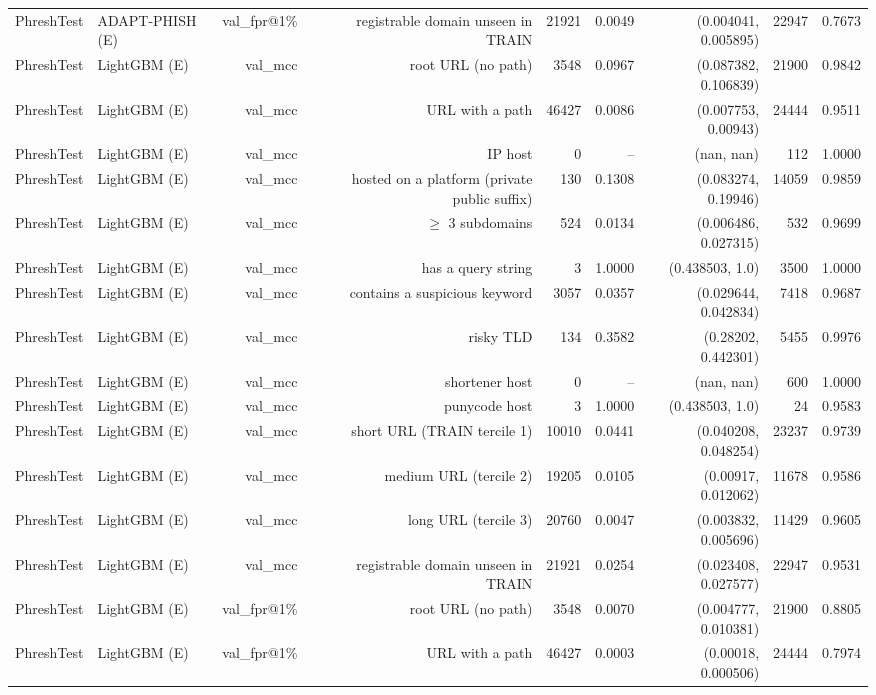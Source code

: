 \begin{table}[t]
\begin{tabular}{llrrrrrrr}
PhreshTest & ADAPT-PHISH (E) & val\_fpr@1\% & registrable domain unseen in TRAIN & 21921 & 0.0049 & (0.004041, 0.005895) & 22947 & 0.7673 \\
PhreshTest & LightGBM (E) & val\_mcc & root URL (no path) & 3548 & 0.0967 & (0.087382, 0.106839) & 21900 & 0.9842 \\
PhreshTest & LightGBM (E) & val\_mcc & URL with a path & 46427 & 0.0086 & (0.007753, 0.00943) & 24444 & 0.9511 \\
PhreshTest & LightGBM (E) & val\_mcc & IP host & 0 & -- & (nan, nan) & 112 & 1.0000 \\
PhreshTest & LightGBM (E) & val\_mcc & hosted on a platform (private public suffix) & 130 & 0.1308 & (0.083274, 0.19946) & 14059 & 0.9859 \\
PhreshTest & LightGBM (E) & val\_mcc & $\geq$ 3 subdomains & 524 & 0.0134 & (0.006486, 0.027315) & 532 & 0.9699 \\
PhreshTest & LightGBM (E) & val\_mcc & has a query string & 3 & 1.0000 & (0.438503, 1.0) & 3500 & 1.0000 \\
PhreshTest & LightGBM (E) & val\_mcc & contains a suspicious keyword & 3057 & 0.0357 & (0.029644, 0.042834) & 7418 & 0.9687 \\
PhreshTest & LightGBM (E) & val\_mcc & risky TLD & 134 & 0.3582 & (0.28202, 0.442301) & 5455 & 0.9976 \\
PhreshTest & LightGBM (E) & val\_mcc & shortener host & 0 & -- & (nan, nan) & 600 & 1.0000 \\
PhreshTest & LightGBM (E) & val\_mcc & punycode host & 3 & 1.0000 & (0.438503, 1.0) & 24 & 0.9583 \\
PhreshTest & LightGBM (E) & val\_mcc & short URL (TRAIN tercile 1) & 10010 & 0.0441 & (0.040208, 0.048254) & 23237 & 0.9739 \\
PhreshTest & LightGBM (E) & val\_mcc & medium URL (tercile 2) & 19205 & 0.0105 & (0.00917, 0.012062) & 11678 & 0.9586 \\
PhreshTest & LightGBM (E) & val\_mcc & long URL (tercile 3) & 20760 & 0.0047 & (0.003832, 0.005696) & 11429 & 0.9605 \\
PhreshTest & LightGBM (E) & val\_mcc & registrable domain unseen in TRAIN & 21921 & 0.0254 & (0.023408, 0.027577) & 22947 & 0.9531 \\
PhreshTest & LightGBM (E) & val\_fpr@1\% & root URL (no path) & 3548 & 0.0070 & (0.004777, 0.010381) & 21900 & 0.8805 \\
PhreshTest & LightGBM (E) & val\_fpr@1\% & URL with a path & 46427 & 0.0003 & (0.00018, 0.000506) & 24444 & 0.7974 \\

\end{tabular}
\end{table}
